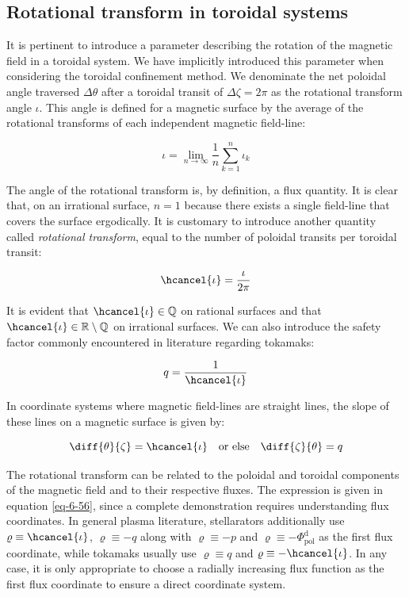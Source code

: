 \subsection{Rotational transform in toroidal systems}

\label{subsec-rot-transform}

It is pertinent to introduce a parameter describing the rotation of the magnetic field in a toroidal system. We have implicitly introduced this parameter when considering the toroidal confinement method. We denominate the net poloidal angle traversed $\Delta\theta$ after a toroidal transit of $\Delta\zeta=2\pi$ as the rotational transform angle $\iota$. This angle is defined for a magnetic surface by the average of the rotational transforms of each independent magnetic field-line:

\begin{equation}
    \iota=\lim_{n\to\infty}\frac{1}{n}\sum_{k=1}^n\iota_k
\end{equation}

The angle of the rotational transform is, by definition, a flux quantity. It is clear that, on an irrational surface, $n=1$ because there exists a single field-line that covers the surface ergodically. It is customary to introduce another quantity called \textit{rotational transform}, equal to the number of poloidal transits per toroidal transit:

\begin{equation}
    \hcancel{\iota}=\frac{\iota}{2\pi}
\end{equation}

It is evident that $\hcancel{\iota}\in\mathbb{Q}$ on rational surfaces and that $\hcancel{\iota}\in\mathbb{R}\setminus\mathbb{Q}$ on irrational surfaces. We can also introduce the safety factor commonly encountered in literature regarding tokamaks:

\begin{equation}
    q=\frac{1}{\hcancel{\iota}}
\end{equation}

In coordinate systems where magnetic field-lines are straight lines, the slope of these lines on a magnetic surface is given by:

\begin{equation}
    \diff{\theta}{\zeta}=\hcancel{\iota}\quad\text{or else}\quad\diff{\zeta}{\theta}=q
\end{equation}

The rotational transform can be related to the poloidal and toroidal components of the magnetic field and to their respective fluxes. The expression is given in equation \ref{eq-6-56}, since a complete demonstration requires understanding flux coordinates. In general plasma literature, stellarators additionally use $\varrho\equiv\hcancel{\iota}$, $\varrho\equiv-q$ along with $\varrho\equiv-p$ and $\varrho\equiv-\Phi_\text{pol}^\mathrm{d}$ as the first flux coordinate, while tokamaks usually use $\varrho\equiv q$ and $\varrho\equiv-\hcancel{\iota}$. In any case, it is only appropriate to choose a radially increasing flux function as the first flux coordinate to ensure a direct coordinate system.

